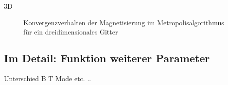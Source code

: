 3D

\begin{figure}[H]
	\centering
	\caption{Konvergenzverhalten der Magnetisierung im Metropolisalgorithmus für ein dreidimensionales Gitter}
	\label{mp3dkonv}
\end{figure}

\subsection{Im Detail: Funktion weiterer Parameter}

Unterschied B T Mode etc. ..
